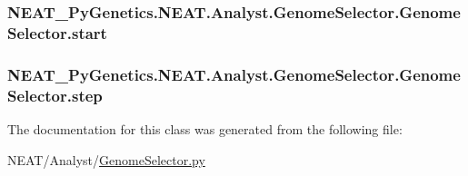 \subsubsection[{\texorpdfstring{start}{start}}]{\setlength{\rightskip}{0pt plus 5cm}N\+E\+A\+T\+\_\+\+Py\+Genetics.\+N\+E\+A\+T.\+Analyst.\+Genome\+Selector.\+Genome\+Selector.\+start\hspace{0.3cm}{\ttfamily [static]}}\hypertarget{classNEAT__PyGenetics_1_1NEAT_1_1Analyst_1_1GenomeSelector_1_1GenomeSelector_a41d6d1538df7134f2f31519ff49f6c58}{}\label{classNEAT__PyGenetics_1_1NEAT_1_1Analyst_1_1GenomeSelector_1_1GenomeSelector_a41d6d1538df7134f2f31519ff49f6c58}
\subsubsection[{\texorpdfstring{step}{step}}]{\setlength{\rightskip}{0pt plus 5cm}N\+E\+A\+T\+\_\+\+Py\+Genetics.\+N\+E\+A\+T.\+Analyst.\+Genome\+Selector.\+Genome\+Selector.\+step\hspace{0.3cm}{\ttfamily [static]}}\hypertarget{classNEAT__PyGenetics_1_1NEAT_1_1Analyst_1_1GenomeSelector_1_1GenomeSelector_af8c8af7836b5ae5b52f6688c1266bb06}{}\label{classNEAT__PyGenetics_1_1NEAT_1_1Analyst_1_1GenomeSelector_1_1GenomeSelector_af8c8af7836b5ae5b52f6688c1266bb06}


The documentation for this class was generated from the following file\+:\begin{DoxyCompactItemize}
\item 
N\+E\+A\+T/\+Analyst/\hyperlink{GenomeSelector_8py}{Genome\+Selector.\+py}\end{DoxyCompactItemize}
